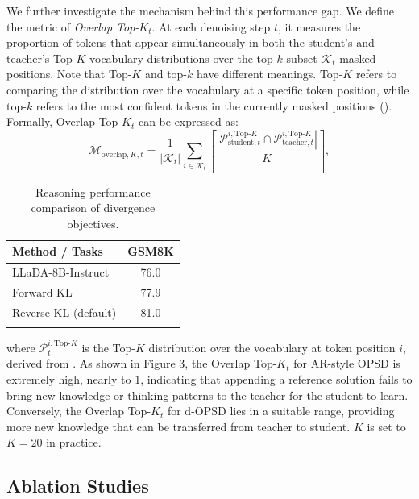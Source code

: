 \documentclass{llmxive}
\begin{document}
We further investigate the mechanism behind this performance gap. We define the metric of \textit{Overlap Top-$K_t$}. At each denoising step $t$, it measures the proportion of tokens that appear simultaneously in both the student’s and teacher’s Top-$K$ vocabulary distributions over the top-$k$ subset $\mathcal{K}_t$ masked positions. Note that Top-$K$ and top-$k$ have different meanings. Top-$K$ refers to comparing the distribution over the vocabulary at a specific token position, while top-$k$ refers to the most confident tokens in the currently masked positions (). Formally, Overlap Top-$K_t$ can be expressed as:
\begin{equation}
    \mathcal{M}_{\text{overlap}, K, t} =  \frac{1}{|\mathcal{K}_t|}  \sum_{i \in \mathcal{K}_t} \left[ \frac{|\mathcal{P}_{\text{student}, t}^{i,\text{Top-}K} \cap \mathcal{P}_{\text{teacher}, t}^{i, \text{Top-}K}|}{K}   \right],
\end{equation}

\begin{table}[t]
\vspace{-20pt}
\setlength{\tabcolsep}{4pt}
\centering
\begin{tabular}{lc}
\toprule
\textbf{Method / Tasks} & \textbf{GSM8K} \\
\midrule
LLaDA-8B-Instruct & 76.0 \\
Forward KL & 77.9 \\
Reverse KL (default) & \cellcolor{lightblue} 81.0 \\
\bottomrule
\label{tab5}
\end{tabular}
\vspace{-20pt}

\caption{Reasoning performance comparison of divergence objectives.}
\end{table}

where $\mathcal{P}_{t}^{i,\text{Top-}K}$ is the Top-$K$ distribution over the vocabulary at token position $i$, derived from . As shown in Figure 3, the Overlap Top-$K_t$ for AR-style OPSD is extremely high, nearly to $1$, indicating that appending a reference solution fails to bring new knowledge or thinking patterns to the teacher for the student to learn. Conversely, the Overlap Top-$K_t$ for d-OPSD lies in a suitable range, providing more new knowledge that can be transferred from teacher to student. $K$ is set to $K=20$ in practice.


\subsection{Ablation Studies} \label{sec4.4}
\end{document}
